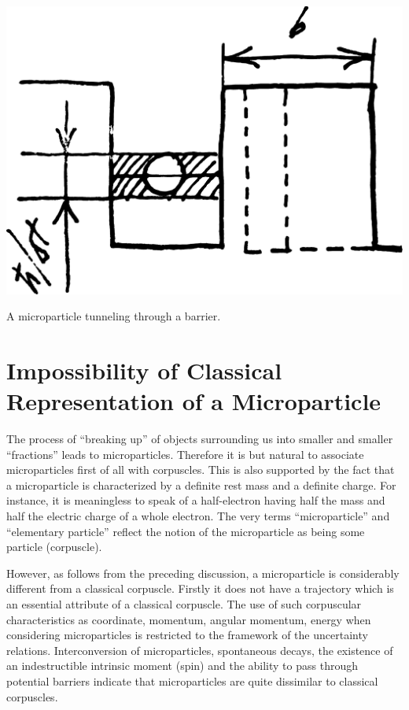 \documentclass[a4paper,sfsidenotes,colorlinks=true]{tufte-book}
\numberwithin{equation}{section}
\numberwithin{figure}{section}
\begin{document}
\begin{marginfigure}[5cm]%
\centering
\includegraphics[width=\linewidth]{figures/fig-04-02.pdf}
\caption{A microparticle tunneling through a barrier.}
\label{fig-4.2}
\end{marginfigure}
\section{Impossibility of Classical Representation of a Microparticle}
\label{sec-05}
The process 
of ``breaking up'' of objects surrounding us into smaller and smaller
``fractions'' leads to microparticles. Therefore it is but natural to
associate microparticles first of all with corpuscles. This is also
supported by the fact that a microparticle is characterized by a
definite rest mass and a definite charge. For instance, it is
meaningless to speak of a half-electron having half the mass and half
the electric charge of a whole electron. The very terms
``microparticle'' and ``elementary particle'' reflect the notion of the
microparticle as being some particle (corpuscle).

However, as follows from the preceding discussion, a microparticle is considerably different from a classical corpuscle. Firstly it does not have a trajectory which is an essential attribute of a classical corpuscle. The use of such corpuscular characteristics as coordinate, momentum, angular momentum, energy when considering microparticles is restricted to the framework of the uncertainty relations. Interconversion of microparticles, spontaneous decays, the existence of an indestructible intrinsic moment (spin) and the ability to pass through potential
barriers indicate that microparticles are quite dissimilar to
classical corpuscles. 
\end{document}
